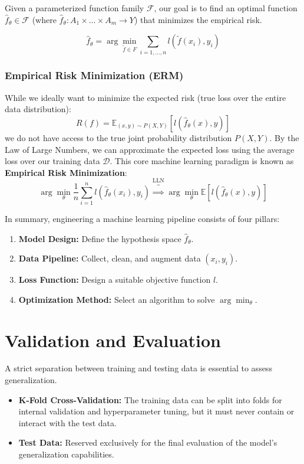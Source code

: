 \documentclass{article}
\begin{document}
Given a parameterized function family $\mathcal{F}$, our goal is to find an optimal function $\hat{f}_{\theta} \in \mathcal{F}$ (where $\hat{f}_{\theta}: A_1 \times \dots \times A_m \to Y$) that minimizes the empirical risk.

\[\hat{f}_{\theta} = \arg\min_{\tilde{f}\in F }\sum_{i=1,...,n}l(\tilde{f}(x_i),y_i)\]

\subsubsection{Empirical Risk Minimization (ERM)}
While we ideally want to minimize the expected risk (true loss over the entire data distribution):
\[ R(f) = \mathbb{E}_{(x,y) \sim P(X,Y)} [l(\hat{f}_{\theta}(x), y)] \]
we do not have access to the true joint probability distribution $P(X,Y)$. By the Law of Large Numbers, we can approximate the expected loss using the average loss over our training data $\mathcal{D}$. This core machine learning paradigm is known as \textbf{Empirical Risk Minimization}:
\[ \arg\min_{\theta} \frac{1}{n} \sum_{i=1}^{n} l(\hat{f}_{\theta}(x_i), y_i) \overbrace{\Rightarrow}^{\text{LLN}} \arg\min_\theta \mathbb{E}[l(\hat{f}_\theta (x), y)]\]

In summary, engineering a machine learning pipeline consists of four pillars:
\begin{enumerate}
  \item \textbf{Model Design:} Define the hypothesis space $\hat{f}_{\theta}$.
  \item \textbf{Data Pipeline:} Collect, clean, and augment data $(x_i, y_i)$.
  \item \textbf{Loss Function:} Design a suitable objective function $l$.
  \item \textbf{Optimization Method:} Select an algorithm to solve $\arg\min_{\theta}$.
\end{enumerate}

\section{Validation and Evaluation}
A strict separation between training and testing data is essential to assess generalization. 

\begin{itemize}
    \item \textbf{K-Fold Cross-Validation:} The training data can be split into folds for internal validation and hyperparameter tuning, but it must never contain or interact with the test data.
    \item \textbf{Test Data:} Reserved exclusively for the final evaluation of the model's generalization capabilities.
\end{itemize}
\end{document}
